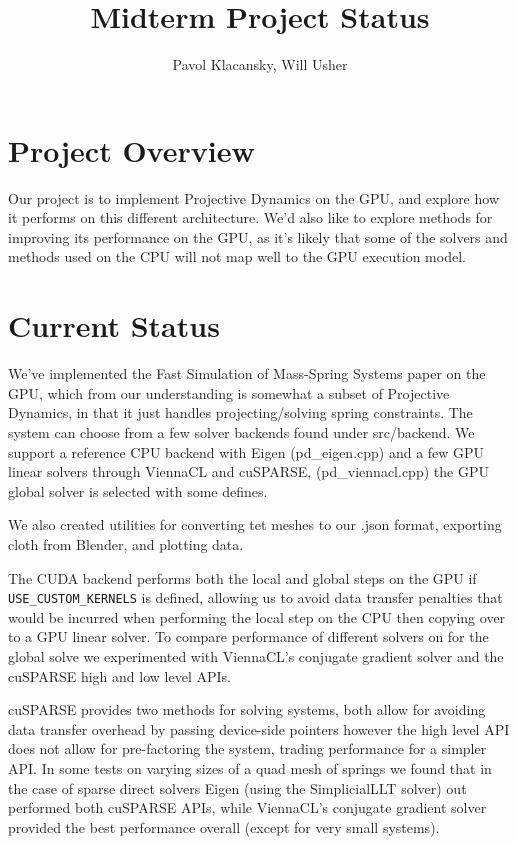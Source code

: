 \documentclass[11pt]{article}
\begin{document}
\title{Midterm Project Status}
\author{Pavol Klacansky, Will Usher}
\maketitle

\section{Project Overview}

Our project is to implement Projective Dynamics on the GPU, and explore how it performs
on this different architecture. We'd also like to explore methods for improving its performance
on the GPU, as it's likely that some of the solvers and methods used on the CPU will not map
well to the GPU execution model.

\section{Current Status}

We've implemented the Fast Simulation of Mass-Spring Systems paper on the GPU, which
from our understanding is somewhat a subset of Projective Dynamics, in that it just handles
projecting/solving spring constraints. The system can choose from a few solver backends found under
src/backend. We support a reference CPU backend with Eigen (pd\_eigen.cpp) and a few GPU
linear solvers through ViennaCL and cuSPARSE, (pd\_viennacl.cpp) the GPU global solver is selected
with some defines.

We also created utilities for converting tet meshes to our .json format,
exporting cloth from Blender, and plotting data.

The CUDA backend performs both the local and global steps on the GPU if \texttt{USE\_CUSTOM\_KERNELS} is
defined, allowing us to avoid data transfer penalties that would be incurred when performing the
local step on the CPU then copying over to a GPU linear solver. To compare performance of different solvers
on for the global solve we experimented with ViennaCL's conjugate gradient solver and the cuSPARSE high
and low level APIs.

cuSPARSE provides two methods for solving systems, both allow for avoiding data transfer overhead
by passing device-side pointers however the high level API does not allow for pre-factoring the system,
trading performance for a simpler API. In some tests on varying sizes of a quad mesh of springs we
found that in the case of sparse direct solvers Eigen (using the SimplicialLLT solver) out performed
both cuSPARSE APIs, while ViennaCL's conjugate gradient solver provided the best performance overall
(except for very small systems).
\end{document}
